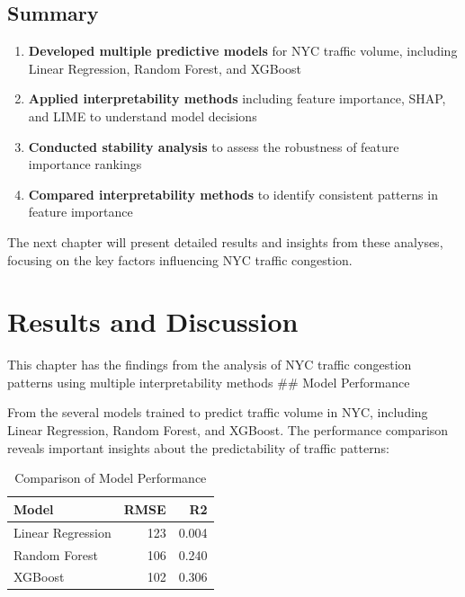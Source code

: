 \documentclass[
  letterpaper,
  DIV=11,
  numbers=noendperiod]{scrreprt}
\providecommand{\tightlist}{%
  \setlength{\itemsep}{0pt}\setlength{\parskip}{0pt}}\usepackage{longtable,booktabs,array}
\begin{document}
\section{Summary}\label{summary-1}

\begin{enumerate}
\def\labelenumi{\arabic{enumi}.}
\tightlist
\item
  \textbf{Developed multiple predictive models} for NYC traffic volume,
  including Linear Regression, Random Forest, and XGBoost
\item
  \textbf{Applied interpretability methods} including feature
  importance, SHAP, and LIME to understand model decisions
\item
  \textbf{Conducted stability analysis} to assess the robustness of
  feature importance rankings
\item
  \textbf{Compared interpretability methods} to identify consistent
  patterns in feature importance
\end{enumerate}

The next chapter will present detailed results and insights from these
analyses, focusing on the key factors influencing NYC traffic
congestion.


\chapter{Results and Discussion}\label{results-and-discussion}

This chapter has the findings from the analysis of NYC traffic
congestion patterns using multiple interpretability methods \#\# Model
Performance

From the several models trained to predict traffic volume in NYC,
including Linear Regression, Random Forest, and XGBoost. The performance
comparison reveals important insights about the predictability of
traffic patterns:

\begin{longtable}[t]{lrr}
\caption{\label{tab:load-results}Comparison of Model Performance}\\
\toprule
Model & RMSE & R2\\
\midrule
Linear Regression & 123 & 0.004\\
Random Forest & 106 & 0.240\\
XGBoost & 102 & 0.306\\
\bottomrule
\end{longtable}
\end{document}
